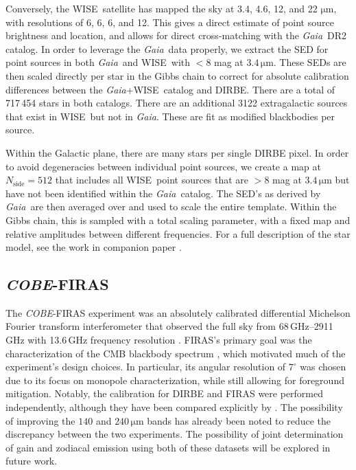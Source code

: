 \documentclass{aa}
\def\COBE{\textit{COBE}}
\def\GAIA{\textit{Gaia}}
\def\gaia{\textit{Gaia}}
\def\WISE{WISE}
\begin{document}
Conversely, the \WISE\ satellite \citep{wright:2010} has mapped the sky at 3.4, 4.6, 12, and 22 $\mathrm{\mu m}$, with resolutions of 6, 6, 6, and 12. This gives a direct estimate of point source brightness and location, and allows for direct cross-matching with the \GAIA\ DR2 catalog. In order to leverage the \gaia\ data properly, we extract the SED for point sources in both \gaia\ and \WISE\ with $<8$ mag at $3.4\,\mathrm{\mu m}$. These SEDs are then scaled directly per star in the Gibbs chain to correct for absolute calibration differences between the \gaia+\WISE\ catalog and DIRBE. There are a total of 717\,454 stars in both catalogs. There are an additional 3122 extragalactic sources that exist in \WISE\ but not in \gaia. These are fit as modified blackbodies per source.


Within the Galactic plane, there are many stars per single DIRBE pixel. In order to avoid degeneracies between individual point sources, we create a map at $N_\mathrm{side}=512$ that includes all \WISE\ point sources that are $>8$ mag at $3.4\,\mathrm{\mu m}$ but have not been identified within the \gaia\ catalog. The SED's as derived by \gaia\ are then averaged over and used to scale the entire template. Within the Gibbs chain, this is sampled with a total scaling parameter, with a fixed map and relative amplitudes between different frequencies. For a full description of the star model, see the work in companion paper \citet{CG02_04}.



\subsection{\COBE-FIRAS}

The \COBE-FIRAS experiment was an absolutely calibrated differential Michelson Fourier transform interferometer that observed the full sky from 68\,GHz--2911\,GHz with 13.6\,GHz frequency resolution \citep{fixsen:1994,mather:1999}. 
FIRAS's primary goal was the characterization of the CMB blackbody spectrum \citep{mather:1994}, which motivated much of the experiment's design choices. In particular, its angular resolution of $7^\circ$ was chosen due to its focus on monopole characterization, while still allowing for foreground mitigation. Notably, the calibration for DIRBE and FIRAS were performed independently, although they have been compared explicitly by \citet{fixsen1997}. The possibility of improving the $140$ and $240\,\mathrm{\mu m}$ bands has already been noted to reduce the discrepancy between the two experiments. The possibility of joint determination of gain and zodiacal emission using both of these datasets will be explored in future work.
\end{document}
